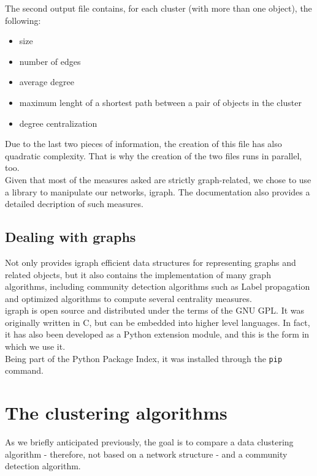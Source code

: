 \documentclass[a4paper,11pt]{book}
\begin{document}
The second output file contains, for each cluster (with more than one object), the following:
\begin{itemize}
\item size
\item number of edges
\item average degree
\item maximum lenght of a shortest path between a pair of objects in the cluster
\item degree centralization
\end{itemize}
Due to the last two pieces of information, the creation of this file has also quadratic complexity. That is why the creation of the two files runs in parallel, too.\\
Given that most of the measures asked are strictly graph-related, we chose to use a library to manipulate our networks, igraph\cite{igr}. The documentation also provides a detailed decription of such measures.
\subsection{Dealing with graphs}
Not only provides igraph efficient data structures for representing graphs and related objects, but it also contains the implementation of many graph algorithms, including community detection algorithms such as Label propagation and optimized algorithms to compute several centrality measures.\\

igraph is open source and distributed under the terms of the GNU GPL. It was originally written in C, but can be embedded into higher level languages. In fact, it has also been developed as a Python extension module, and this is the form in which we use it.\\
Being part of the Python Package Index, it was installed through the \lstinline!pip! command.
\section{The clustering algorithms}
As we briefly anticipated previously, the goal is to compare a data clustering algorithm - therefore, not based on a network structure - and a community detection algorithm.
\end{document}
